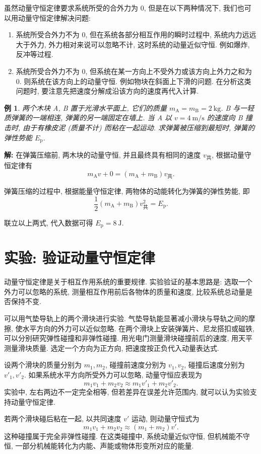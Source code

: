 \documentclass[UTF8,openany,fontset=fandol]{ctexbook}
\theoremstyle{chinesetextbook}
\newtheorem{example}{例}[chapter]
\newenvironment{solution}{\par\indent\textbf{解:} \ignorespaces}{\par}
\newcommand{\unit}[1]{\ \mathrm{#1}}
\begin{document}
虽然动量守恒定律要求系统所受的合外力为 0, 但是在以下两种情况下, 我们也可以用动量守恒定律解决问题:
\begin{enumerate}
\item 系统所受合外力不为 0, 但在系统各部分相互作用的瞬时过程中, 系统内力远远大于外力, 外力相对来说可以忽略不计, 这时系统的动量近似守恒. 例如爆炸, 反冲等过程.
\item 系统所受合外力不为 0, 但系统在某一方向上不受外力或该方向上外力之和为 0. 则系统在该方向上的动量守恒. 例如物块在斜面上下滑的问题. 在分析这类问题时, 要注意先把速度分解成沿该方向的速度再代入计算.
\end{enumerate}
\begin{example}
两个木块 A, B 置于光滑水平面上, 它们的质量 $m_\mathrm{A}=m_\mathrm{B}=2\unit{kg}$. B 与一轻质弹簧的一端相连, 弹簧的另一端固定在墙上. 当 A 以 $v=4\unit{m/s}$ 的速度向 B 撞击时, 由于有橡皮泥 (质量不计) 而粘在一起运动. 求弹簧被压缩到最短时, 弹簧的弹性势能 $E_\mathrm{p}$.
\end{example}
\begin{solution}
在弹簧压缩前, 两木块的动量守恒, 并且最终具有相同的速度 $v_\text{共}$, 根据动量守恒定律有
\[
m_\mathrm{A}v+0=(m_\mathrm{A}+m_\mathrm{B})v_\text{共}.
\]

弹簧压缩的过程中, 根据能量守恒定律, 两物体的动能转化为弹簧的弹性势能, 即
\[
\frac12 (m_\mathrm{A}+m_\mathrm{B}) v_\text{共}^2=E_\mathrm{p}.
\]

联立以上两式, 代入数据可得 $E_\mathrm{p}=8\unit{J}$.
\end{solution}
\section{实验: 验证动量守恒定律}
动量守恒定律是关于相互作用系统的重要规律. 实验验证的基本思路是: 选取一个外力可以忽略的系统, 测量相互作用前后各物体的质量和速度, 比较系统总动量是否保持不变.

可以用气垫导轨上的两个滑块进行实验. 气垫导轨能显著减小滑块与导轨之间的摩擦, 使水平方向的外力可以近似忽略. 在两个滑块上安装弹簧片、尼龙搭扣或磁铁, 可以分别研究弹性碰撞和非弹性碰撞. 用光电门测量滑块碰撞前后的速度, 用天平测量滑块质量. 选定一个方向为正方向, 把速度按正负代入动量表达式.

设两个滑块的质量分别为 $m_1,m_2$, 碰撞前速度分别为 $v_1,v_2$, 碰撞后速度分别为 $v'_1,v'_2$. 如果系统水平方向所受外力可以忽略, 动量守恒应表现为
\[
m_1v_1+m_2v_2\approx m_1v'_1+m_2v'_2.
\]
实验中, 左右两边不一定完全相等, 但若差异在误差允许范围内, 就可以认为实验支持动量守恒定律.

若两个滑块碰后粘在一起, 以共同速度 $v'$ 运动, 则动量守恒式为
\[
m_1v_1+m_2v_2\approx (m_1+m_2)v'.
\]
这种碰撞属于完全非弹性碰撞. 在这类碰撞中, 系统动量近似守恒, 但机械能不守恒, 一部分机械能转化为内能、声能或物体形变所对应的能量.
\end{document}
